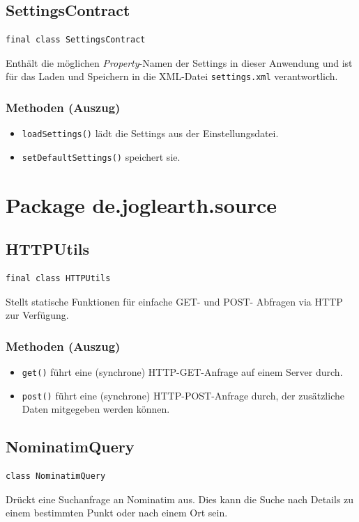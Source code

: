 \documentclass[10pt]{scrreprt}
\begin{document}
\vspace{5mm}
\subsection*{SettingsContract}
\begin{lstlisting}
final class SettingsContract
\end{lstlisting}
Enthält die möglichen \textit{Property}-Namen der Settings in dieser Anwendung und ist für das Laden und Speichern in die XML-Datei \texttt{settings.xml} verantwortlich.\\
\subsubsection*{Methoden (Auszug)}
\begin{itemize}
\item \texttt{loadSettings()} lädt die Settings aus der Einstellungsdatei.
\item \texttt{setDefaultSettings()} speichert sie.
\end{itemize}



\pagebreak
\section{Package de.joglearth.source}
\subsection*{HTTPUtils}
\begin{lstlisting}
final class HTTPUtils
\end{lstlisting}
Stellt statische Funktionen für einfache GET- und POST- Abfragen via HTTP zur Verfügung.\\
\subsubsection*{Methoden (Auszug)}
\begin{itemize}
\item \texttt{get()} führt eine (synchrone) HTTP-GET-Anfrage auf einem Server durch.
\item \texttt{post()} führt eine (synchrone) HTTP-POST-Anfrage durch, der zusätzliche Daten mitgegeben werden können.
\end{itemize}

\vspace{5mm}
\subsection*{NominatimQuery}
\begin{lstlisting}
class NominatimQuery
\end{lstlisting}
Drückt eine Suchanfrage an Nominatim aus. Dies kann die Suche nach Details zu einem bestimmten Punkt oder nach einem Ort sein.\\
\end{document}
